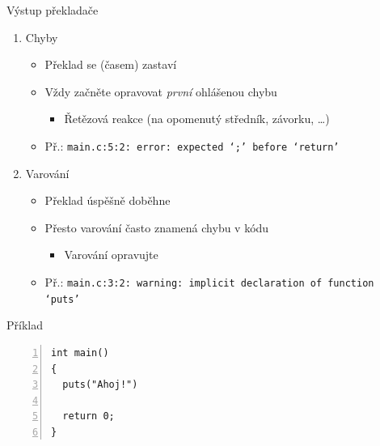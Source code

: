 \begin{frame}[fragile]{Výstup překladače}

  \begin{enumerate}
    \item Chyby
    \begin{itemize}
      \item Překlad se (časem) zastaví
      \item Vždy začněte opravovat \emph{první} ohlášenou chybu
      \begin{itemize}
	\item Řetězová reakce (na opomenutý středník, závorku, \dots)
      \end{itemize}

      \pause

      \item Př.: \texttt{\scriptsize main.c:5:2: error: expected ‘;’ before
        ‘return’}
    \end{itemize}

    \pause

    \item Varování
    \begin{itemize}
      \item Překlad úspěšně doběhne
      \item Přesto varování často znamená chybu v kódu
      \begin{itemize}
	\item Varování opravujte
      \end{itemize}

      \pause

      \item Př.: \texttt{\scriptsize main.c:3:2: warning: implicit declaration
        of function ‘puts’}
    \end{itemize}

  \end{enumerate}


  \begin{block}{Příklad}
  \begin{lstlisting}[numbers=left,xleftmargin=2em,frame=leftline]
int main()
{
  puts("Ahoj!")

  return 0;
}
  \end{lstlisting}
  \end{block}

\end{frame}


